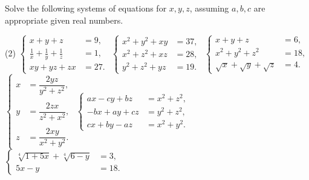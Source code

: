 \documentclass[12pt,a4paper]{memoir}
\theoremstyle{definition}
\begin{document}
	\begin{question}
		Solve the following systems of equations for $x,y,z$, assuming $a,b,c$ are appropriate given real numbers.
		\begin{tasks}(2)
			\task $\begin{cases}
				x+y+z &= 9,\\ \displaystyle \frac{1}{x} + \frac{1}{y} + \frac{1}{z} &= 1,\\ xy+yz+zx &= 27.
			\end{cases}$
			\task $\begin{cases}
				x^2+y^2+xy &= 37,\\ x^2+z^2+xz &= 28,\\ y^2+z^2+yz &= 19.
			\end{cases}$
			\task $\begin{cases}
				x+y+z &= 6,\\ x^2+y^2+z^2 &= 18,\\ \sqrt{x}+\sqrt{y}+\sqrt{z} &= 4.
			\end{cases}$
			\task $\begin{cases}
				\displaystyle x &= \dfrac{2yz}{y^2+z^2},\\ \\ \displaystyle y&= \dfrac{2zx}{z^2+x^2},\\ \\ \displaystyle z &= \dfrac{2xy}{x^2+y^2}.
			\end{cases}$
			\task $\begin{cases}
				ax-cy+bz &= x^2+z^2, \\ -bx+ay+cz &= y^2+z^2,\\ cx + by - az &= x^2+y^2.
			\end{cases}$
			\task $\begin{cases}
				\sqrt[4]{1+5x}+\sqrt[4]{6-y} &= 3,\\ 5x-y &= 18.
			\end{cases}$
		\end{tasks}
	\end{question}
\end{document}
